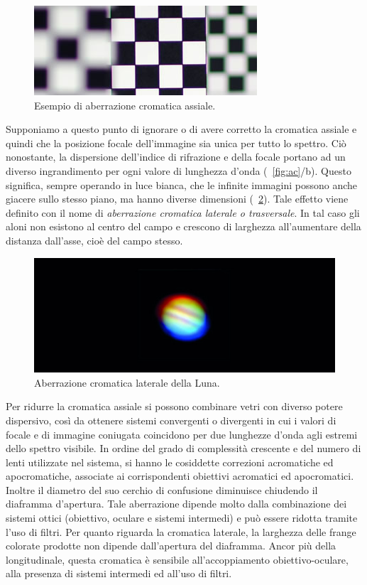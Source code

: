 \begin{figure}
 \centering
 \includegraphics[scale=.88]{img/CAP2aca.jpg}
 \caption{\small{Esempio di aberrazione cromatica assiale.}}
 \label{fig:aca}
\end{figure}

Supponiamo a questo punto di ignorare o di avere corretto la cromatica assiale e quindi che la posizione focale dell'immagine sia unica per tutto lo spettro.
Ciò nonostante, la dispersione dell'indice di rifrazione e della focale portano ad un diverso ingrandimento per ogni valore di lunghezza d'onda (\figurename~\ref{fig:ac}/b). 
Questo significa, sempre operando in luce bianca, che le infinite immagini possono anche giacere sullo stesso piano, ma hanno diverse dimensioni (\figurename~\ref{fig:acl}). 
Tale effetto viene definito con il nome di \textit{aberrazione cromatica laterale o trasversale}.
In tal caso gli aloni non esistono al centro del campo e crescono di larghezza all'aumentare della distanza dall'asse, cioè del campo stesso.

\begin{figure}
 \centering
 \includegraphics[scale=.40]{img/CAP2acl.jpg}
 \caption{\small{Aberrazione cromatica laterale della Luna.}}
 \label{fig:acl}
\end{figure}

Per ridurre la cromatica assiale si possono combinare vetri con diverso potere dispersivo, così da ottenere sistemi convergenti o divergenti in cui i valori di focale e di immagine coniugata coincidono per due lunghezze d'onda agli estremi dello spettro visibile. 
In ordine del grado di complessità crescente e del numero di lenti utilizzate nel sistema, si hanno le cosiddette correzioni acromatiche ed apocromatiche, associate ai corrispondenti obiettivi acromatici ed apocromatici. 
Inoltre il diametro del suo cerchio di confusione diminuisce chiudendo il diaframma d'apertura. 
Tale aberrazione dipende molto dalla combinazione dei sistemi ottici (obiettivo, oculare e sistemi intermedi) e può essere ridotta tramite l'uso di filtri. 
Per quanto riguarda la cromatica laterale, la larghezza delle frange colorate prodotte non dipende dall'apertura del diaframma.
Ancor più della longitudinale, questa cromatica è sensibile all'accoppiamento obiettivo-oculare, alla presenza di sistemi intermedi ed all'uso di filtri.

